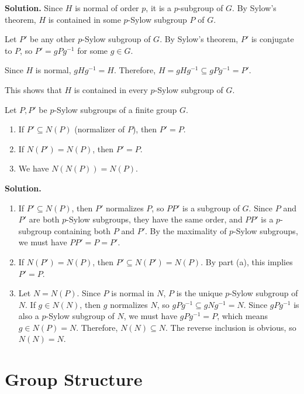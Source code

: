 \noindent\textbf{Solution.} Since $H$ is normal of order $p$, it is a $p$-subgroup of $G$. By Sylow's theorem, $H$ is contained in some $p$-Sylow subgroup $P$ of $G$.

Let $P'$ be any other $p$-Sylow subgroup of $G$. By Sylow's theorem, $P'$ is conjugate to $P$, so $P' = gPg^{-1}$ for some $g \in G$.

Since $H$ is normal, $gHg^{-1} = H$. Therefore, $H = gHg^{-1} \subseteq gPg^{-1} = P'$.

This shows that $H$ is contained in every $p$-Sylow subgroup of $G$.

\begin{problembox}
Let $P, P'$ be $p$-Sylow subgroups of a finite group $G$.
\begin{enumerate}[label=(\alph*)]
\item If $P' \subseteq N(P)$ (normalizer of $P$), then $P' = P$.
\item If $N(P') = N(P)$, then $P' = P$.
\item We have $N(N(P)) = N(P)$.
\end{enumerate}
\end{problembox}

\noindent\textbf{Solution.}
\begin{enumerate}[label=(\alph*)]
\item If $P' \subseteq N(P)$, then $P'$ normalizes $P$, so $PP'$ is a subgroup of $G$. Since $P$ and $P'$ are both $p$-Sylow subgroups, they have the same order, and $PP'$ is a $p$-subgroup containing both $P$ and $P'$. By the maximality of $p$-Sylow subgroups, we must have $PP' = P = P'$.

\item If $N(P') = N(P)$, then $P' \subseteq N(P') = N(P)$. By part (a), this implies $P' = P$.

\item Let $N = N(P)$. Since $P$ is normal in $N$, $P$ is the unique $p$-Sylow subgroup of $N$. If $g \in N(N)$, then $g$ normalizes $N$, so $gPg^{-1} \subseteq gNg^{-1} = N$. Since $gPg^{-1}$ is also a $p$-Sylow subgroup of $N$, we must have $gPg^{-1} = P$, which means $g \in N(P) = N$. Therefore, $N(N) \subseteq N$. The reverse inclusion is obvious, so $N(N) = N$.
\end{enumerate}

\section{Group Structure}


